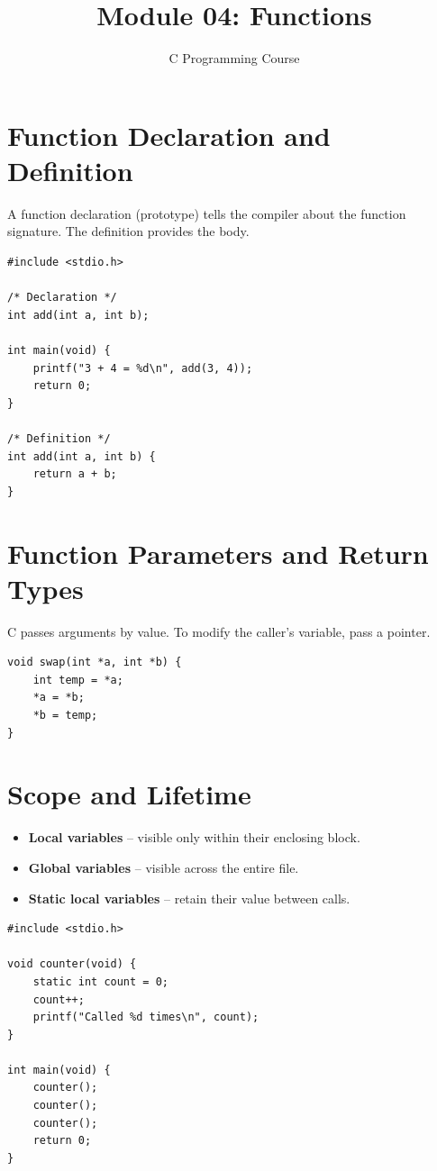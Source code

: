 \documentclass[11pt,a4paper]{article}
\title{Module 04: Functions}
\author{C Programming Course}
\date{}
\begin{document}
\maketitle
\thispagestyle{fancy}

\section{Function Declaration and Definition}
A function declaration (prototype) tells the compiler about the function signature.
The definition provides the body.

\begin{lstlisting}
#include <stdio.h>

/* Declaration */
int add(int a, int b);

int main(void) {
    printf("3 + 4 = %d\n", add(3, 4));
    return 0;
}

/* Definition */
int add(int a, int b) {
    return a + b;
}
\end{lstlisting}

\section{Function Parameters and Return Types}
C passes arguments by value. To modify the caller's variable, pass a pointer.

\begin{lstlisting}
void swap(int *a, int *b) {
    int temp = *a;
    *a = *b;
    *b = temp;
}
\end{lstlisting}

\section{Scope and Lifetime}
\begin{itemize}
  \item \textbf{Local variables} -- visible only within their enclosing block.
  \item \textbf{Global variables} -- visible across the entire file.
  \item \textbf{Static local variables} -- retain their value between calls.
\end{itemize}

\begin{lstlisting}
#include <stdio.h>

void counter(void) {
    static int count = 0;
    count++;
    printf("Called %d times\n", count);
}

int main(void) {
    counter();
    counter();
    counter();
    return 0;
}
\end{lstlisting}
\end{document}

